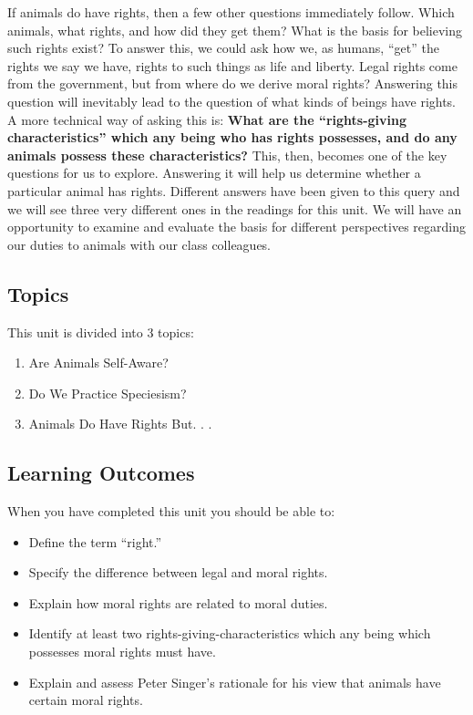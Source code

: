 \documentclass[
]{book}
\providecommand{\tightlist}{%
  \setlength{\itemsep}{0pt}\setlength{\parskip}{0pt}}
\begin{document}
If animals do have rights, then a few other questions immediately follow. Which animals, what rights, and how did they get them? What is the basis for believing such rights exist?
To answer this, we could ask how we, as humans, ``get'' the rights we say we have, rights to such things as life and liberty. Legal rights come from the government, but from where do we derive moral rights? Answering this question will inevitably lead to the question of what kinds of beings have rights.
A more technical way of asking this is: \textbf{What are the ``rights-giving characteristics'' which any being who has rights possesses, and do any animals possess these characteristics?} This, then, becomes one of the key questions for us to explore. Answering it will help us determine whether a particular animal has rights. Different answers have been given to this query and we will see three very different ones in the readings for this unit.
We will have an opportunity to examine and evaluate the basis for different perspectives regarding our duties to animals with our class colleagues.

\hypertarget{topics-6}{%
\subsection*{Topics}\label{topics-6}}

This unit is divided into 3 topics:

\begin{enumerate}
\def\labelenumi{\arabic{enumi}.}
\tightlist
\item
  Are Animals Self-Aware?\\
\item
  Do We Practice Speciesism?\\
\item
  Animals Do Have Rights But. . .
\end{enumerate}

\hypertarget{learning-outcomes-6}{%
\subsection*{Learning Outcomes}\label{learning-outcomes-6}}

When you have completed this unit you should be able to:

\begin{itemize}
\tightlist
\item
  Define the term ``right.''\\
\item
  Specify the difference between legal and moral rights.\\
\item
  Explain how moral rights are related to moral duties.\\
\item
  Identify at least two rights-giving-characteristics which any being which possesses moral rights must have.\\
\item
  Explain and assess Peter Singer's rationale for his view that animals have certain moral rights.
\end{itemize}
\end{document}
